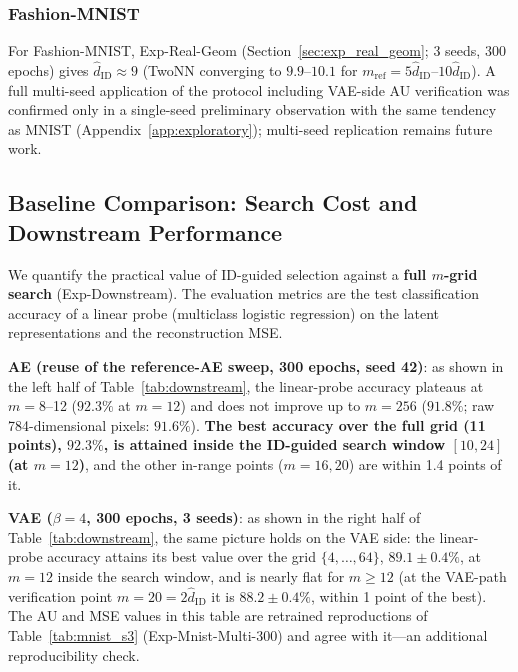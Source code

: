\documentclass[make,article,submit,pdftex,moreauthors]{Definitions/mdpi}
\newcommand{\hatdID}{\hat{d}_{\mathrm{ID}}}
\begin{document}
\subsubsection{Fashion-MNIST}

For Fashion-MNIST, Exp-Real-Geom (Section~\ref{sec:exp_real_geom}; 3 seeds,
300 epochs) gives $\hatdID \approx 9$ (TwoNN converging to $9.9$--$10.1$
for $m_{\mathrm{ref}} = 5\hatdID$--$10\hatdID$).
A full multi-seed application of the protocol including VAE-side AU
verification was confirmed only in a single-seed preliminary observation
with the same tendency as MNIST (Appendix~\ref{app:exploratory}); multi-seed
replication remains future work.

\subsection{Baseline Comparison: Search Cost and Downstream Performance}\label{sec:exp_downstream}

We quantify the practical value of ID-guided selection against a
\textbf{full $m$-grid search} (Exp-Downstream).
The evaluation metrics are the test classification accuracy of a linear
probe (multiclass logistic regression) on the latent representations and the
reconstruction MSE.

\textbf{AE (reuse of the reference-AE sweep, 300 epochs, seed 42)}:
as shown in the left half of Table~\ref{tab:downstream},
the linear-probe accuracy plateaus at $m = 8$--12 ($92.3\%$ at $m = 12$)
and does not improve up to $m = 256$ ($91.8\%$; raw 784-dimensional pixels:
$91.6\%$).
\textbf{The best accuracy over the full grid (11 points), $92.3\%$, is
attained inside the ID-guided search window $[10, 24]$ (at $m = 12$)},
and the other in-range points ($m = 16, 20$) are within 1.4 points of it.

\textbf{VAE ($\beta = 4$, 300 epochs, 3 seeds)}:
as shown in the right half of Table~\ref{tab:downstream}, the same picture
holds on the VAE side: the linear-probe accuracy attains its best value over
the grid $\{4, \ldots, 64\}$, $89.1 \pm 0.4\%$, at $m = 12$ inside the
search window, and is nearly flat for $m \geq 12$
(at the VAE-path verification point $m = 20 = 2\hatdID$ it is
$88.2 \pm 0.4\%$, within 1 point of the best).
The AU and MSE values in this table are retrained reproductions of
Table~\ref{tab:mnist_s3} (Exp-Mnist-Multi-300) and agree with it---an
additional reproducibility check.
\end{document}

